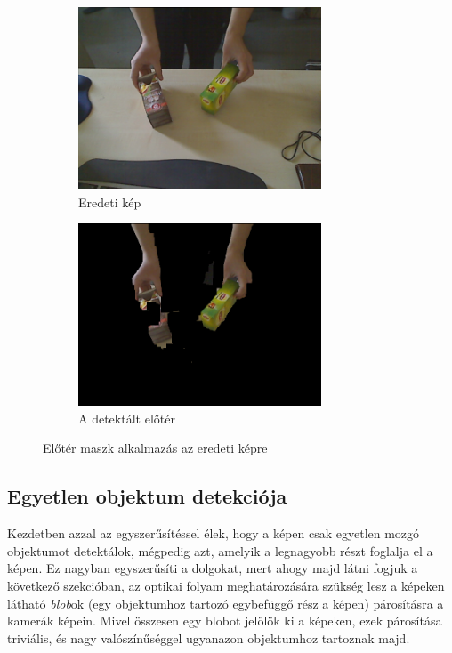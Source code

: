 \begin{figure}[tbh]
\centering
\begin{subfigure}[b]{.49\linewidth}
	\centering
	\includegraphics[width=205pt]{figures/image343.png}
	\caption{Eredeti kép}
  \end{subfigure}
\begin{subfigure}[b]{.49\linewidth}
	\centering
	\includegraphics[width=205pt]{figures/mask343_applied.png}
	\caption{A detektált előtér}
  \end{subfigure}
\caption{Előtér maszk alkalmazás az eredeti képre \label{fig:mask_applied}}
\end{figure}

\subsection{Egyetlen objektum detekciója}

Kezdetben azzal az egyszerűsítéssel élek, hogy a képen csak egyetlen mozgó objektumot detektálok, mégpedig azt, amelyik a legnagyobb részt foglalja el a képen. Ez nagyban egyszerűsíti a dolgokat, mert ahogy majd látni fogjuk a következő szekcióban, az optikai folyam meghatározására szükség lesz a képeken látható \textit{blob}ok (egy objektumhoz tartozó egybefüggő rész a képen) párosításra a kamerák képein. Mivel összesen egy blobot jelölök ki a képeken, ezek párosítása triviális, és nagy valószínűséggel ugyanazon objektumhoz tartoznak majd.

